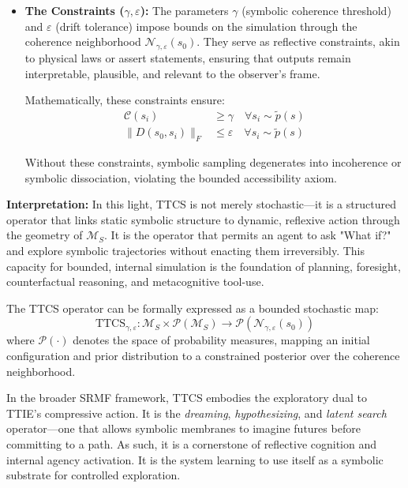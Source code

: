 \begin{scholium}
\begin{itemize}
  \item \textbf{The Constraints ($\gamma, \varepsilon$):}  
  The parameters $\gamma$ (symbolic coherence threshold) and $\varepsilon$ (drift tolerance) impose bounds on the simulation through the coherence neighborhood $\mathcal{N}_{\gamma,\varepsilon}(s_0)$. They serve as reflective constraints, akin to physical laws or assert statements, ensuring that outputs remain interpretable, plausible, and relevant to the observer's frame. 

  Mathematically, these constraints ensure:
  \begin{align}
  \mathcal{C}(s_i) &\geq \gamma \quad \forall s_i \sim \tilde{p}(s) \\
  \|D(s_0, s_i)\|_F &\leq \varepsilon \quad \forall s_i \sim \tilde{p}(s)
  \end{align}

  Without these constraints, symbolic sampling degenerates into incoherence or symbolic dissociation, violating the bounded accessibility axiom.
\end{itemize}

\textbf{Interpretation:}  
In this light, TTCS is not merely stochastic—it is a structured operator that links static symbolic structure to dynamic, reflexive action through the geometry of $\mathcal{M}_S$. It is the operator that permits an agent to ask "What if?" and explore symbolic trajectories without enacting them irreversibly. This capacity for bounded, internal simulation is the foundation of planning, foresight, counterfactual reasoning, and metacognitive tool-use.

The TTCS operator can be formally expressed as a bounded stochastic map:
\[
\text{TTCS}_{\gamma,\varepsilon}: \mathcal{M}_S \times \mathcal{P}(\mathcal{M}_S) \to \mathcal{P}(\mathcal{N}_{\gamma,\varepsilon}(s_0))
\]
where $\mathcal{P}(\cdot)$ denotes the space of probability measures, mapping an initial configuration and prior distribution to a constrained posterior over the coherence neighborhood.

In the broader SRMF framework, TTCS embodies the exploratory dual to TTIE's compressive action. It is the \emph{dreaming}, \emph{hypothesizing}, and \emph{latent search} operator—one that allows symbolic membranes to imagine futures before committing to a path. As such, it is a cornerstone of reflective cognition and internal agency activation. It is the system learning to use itself as a symbolic substrate for controlled exploration.
\end{scholium}

